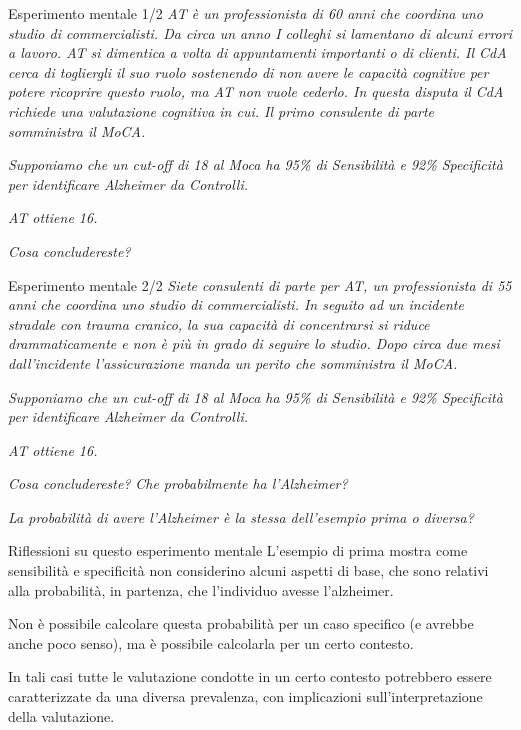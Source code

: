 \documentclass[
  ignorenonframetext,
  aspectratio=169,
]{beamer}
\begin{document}
\begin{frame}{Esperimento mentale 1/2}
\label{esperimento-mentale-12}
\emph{AT è un professionista di 60 anni che coordina uno studio di
commercialisti. Da circa un anno I colleghi si lamentano di alcuni
errori a lavoro. AT si dimentica a volta di appuntamenti importanti o di
clienti. Il CdA cerca di togliergli il suo ruolo sostenendo di non avere
le capacità cognitive per potere ricoprire questo ruolo, ma AT non vuole
cederlo. In questa disputa il CdA richiede una valutazione cognitiva in
cui. Il primo consulente di parte somministra il MoCA.}

\emph{Supponiamo che un cut-off di 18 al Moca ha 95\% di Sensibilità e
92\% Specificità per identificare Alzheimer da Controlli.}

\pause

\emph{AT ottiene 16.}

\emph{Cosa concludereste?}
\end{frame}

\begin{frame}{Esperimento mentale 2/2}
\label{esperimento-mentale-22}
\emph{Siete consulenti di parte per AT, un professionista di 55 anni che
coordina uno studio di commercialisti. In seguito ad un incidente
stradale con trauma cranico, la sua capacità di concentrarsi si riduce
drammaticamente e non è più in grado di seguire lo studio. Dopo circa
due mesi dall'incidente l'assicurazione manda un perito che somministra
il MoCA.}

\emph{Supponiamo che un cut-off di 18 al Moca ha 95\% di Sensibilità e
92\% Specificità per identificare Alzheimer da Controlli.}

\pause

\emph{AT ottiene 16.}

\emph{Cosa concludereste?} \pause \emph{Che probabilmente ha
l'Alzheimer?} \pause

\emph{La probabilità di avere l'Alzheimer è la stessa dell'esempio prima
o diversa?}
\end{frame}

\begin{frame}{Riflessioni su questo esperimento mentale}
\label{riflessioni-su-questo-esperimento-mentale}
L'esempio di prima mostra come sensibilità e specificità non considerino
alcuni aspetti di base, che sono relativi alla probabilità, in partenza,
che l'individuo avesse l'alzheimer.

Non è possibile calcolare questa probabilità per un caso specifico (e
avrebbe anche poco senso), ma è possibile calcolarla per un certo
contesto.

In tali casi tutte le valutazione condotte in un certo contesto
potrebbero essere caratterizzate da una diversa prevalenza, con
implicazioni sull'interpretazione della valutazione.
\end{frame}
\end{document}
